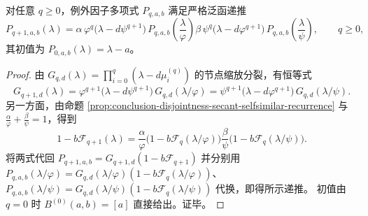 \begin{proposition}\label{prop:conclusion-disjointness-exceptional-poly-scaling-splice}
对任意 \(q\ge 0\)，例外因子多项式 \(P_{q,a,b}\) 满足严格泛函递推
\[
P_{q+1,a,b}(\lambda)
=\alpha\,\varphi^{q}\bigl(\lambda-d\psi^{q+1}\bigr)\,
P_{q,a,b}\!\left(\frac{\lambda}{\varphi}\right)
\beta\,\psi^{q}\bigl(\lambda-d\varphi^{q+1}\bigr)\,
P_{q,a,b}\!\left(\frac{\lambda}{\psi}\right),
\qquad q\ge 0,
\]
其初值为 \(P_{0,a,b}(\lambda)=\lambda-a\)。
\end{proposition}
\begin{proof}
由 \(G_{q,d}(\lambda)=\prod_{i=0}^{q}(\lambda-d\mu_i^{(q)})\) 的节点缩放分裂，有恒等式
\[
G_{q+1,d}(\lambda)
=\varphi^{q+1}\bigl(\lambda-d\psi^{q+1}\bigr)\,G_{q,d}(\lambda/\varphi)
=\psi^{q+1}\bigl(\lambda-d\varphi^{q+1}\bigr)\,G_{q,d}(\lambda/\psi).
\]
另一方面，由命题 \ref{prop:conclusion-disjointness-secant-selfsimilar-recurrence} 与
\(\frac{\alpha}{\varphi}+\frac{\beta}{\psi}=1\)，得到
\[
1-b\mathcal F_{q+1}(\lambda)
=\frac{\alpha}{\varphi}\bigl(1-b\mathcal F_q(\lambda/\varphi)\bigr)
\frac{\beta}{\psi}\bigl(1-b\mathcal F_q(\lambda/\psi)\bigr).
\]
将两式代回
\(
P_{q+1,a,b}=G_{q+1,d}(1-b\mathcal F_{q+1})
\)
并分别用 \(P_{q,a,b}(\lambda/\varphi)=G_{q,d}(\lambda/\varphi)(1-b\mathcal F_q(\lambda/\varphi))\)、
\(P_{q,a,b}(\lambda/\psi)=G_{q,d}(\lambda/\psi)(1-b\mathcal F_q(\lambda/\psi))\) 代换，即得所示递推。
初值由 \(q=0\) 时 \(B^{(0)}(a,b)=[a]\) 直接给出。证毕。
\end{proof}

